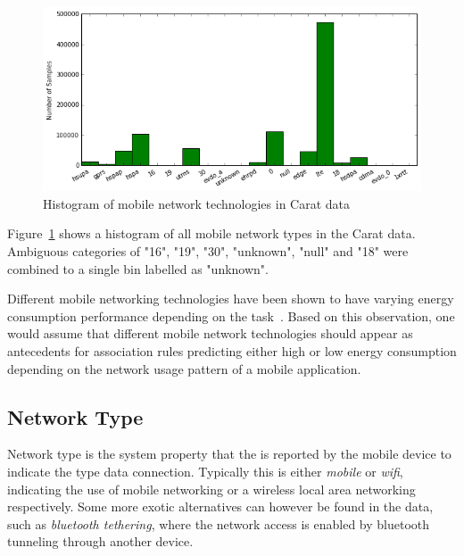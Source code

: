 \begin{figure} %
	\centering
	\includegraphics[width=\textwidth]{images/carat-data/mobile_net_type.png}
	\caption{Histogram of mobile network technologies in Carat data}
	\label{figure:carat-data-mobile-net-type}
\end{figure}   

Figure~\ref{figure:carat-data-mobile-net-type} shows a histogram of all mobile network types in the Carat data. Ambiguous categories of "16", "19", "30", "unknown", "null" and "18" were combined to a single bin labelled as "unknown". 

Different mobile networking technologies have been shown to have varying energy consumption performance depending on the task~\cite{5357972}. Based on this observation, one would assume that different mobile network technologies should appear as antecedents for association rules predicting either high or low energy consumption depending on the network usage pattern of a mobile application.  


\subsection{Network Type}  

Network type is the system property that the is reported by the mobile device to indicate the type data connection. Typically this is either \textit{mobile} or \textit{wifi}, indicating the use of mobile networking or a wireless local area networking respectively. Some more exotic alternatives can however be found in the data, such as \textit{bluetooth tethering}, where the network access is enabled by bluetooth tunneling through another device.

